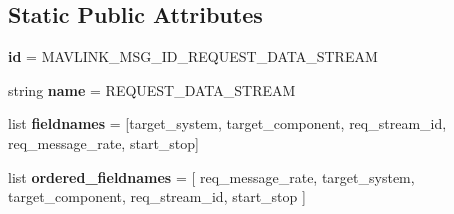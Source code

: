 \subsection*{Static Public Attributes}
\begin{DoxyCompactItemize}
\item 
\mbox{\label{classpymavlink_1_1dialects_1_1v10_1_1MAVLink__request__data__stream__message_a0b11fe3c57462e49916728544f1b598b}} 
{\bfseries id} = M\+A\+V\+L\+I\+N\+K\+\_\+\+M\+S\+G\+\_\+\+I\+D\+\_\+\+R\+E\+Q\+U\+E\+S\+T\+\_\+\+D\+A\+T\+A\+\_\+\+S\+T\+R\+E\+AM
\item 
\mbox{\label{classpymavlink_1_1dialects_1_1v10_1_1MAVLink__request__data__stream__message_a8f452ff560ec4194873dcadbca495078}} 
string {\bfseries name} = \textquotesingle{}R\+E\+Q\+U\+E\+S\+T\+\_\+\+D\+A\+T\+A\+\_\+\+S\+T\+R\+E\+AM\textquotesingle{}
\item 
\mbox{\label{classpymavlink_1_1dialects_1_1v10_1_1MAVLink__request__data__stream__message_aa290acdecdfed6cf1a29b62959cc61c6}} 
list {\bfseries fieldnames} = \mbox{[}\textquotesingle{}target\+\_\+system\textquotesingle{}, \textquotesingle{}target\+\_\+component\textquotesingle{}, \textquotesingle{}req\+\_\+stream\+\_\+id\textquotesingle{}, \textquotesingle{}req\+\_\+message\+\_\+rate\textquotesingle{}, \textquotesingle{}start\+\_\+stop\textquotesingle{}\mbox{]}
\item 
\mbox{\label{classpymavlink_1_1dialects_1_1v10_1_1MAVLink__request__data__stream__message_abd54ea1473ba34bba228565b0155d278}} 
list {\bfseries ordered\+\_\+fieldnames} = \mbox{[} \textquotesingle{}req\+\_\+message\+\_\+rate\textquotesingle{}, \textquotesingle{}target\+\_\+system\textquotesingle{}, \textquotesingle{}target\+\_\+component\textquotesingle{}, \textquotesingle{}req\+\_\+stream\+\_\+id\textquotesingle{}, \textquotesingle{}start\+\_\+stop\textquotesingle{} \mbox{]}
\item 
\mbox{\label{classpymavlink_1_1dialects_1_1v10_1_1MAVLink__request__data__stream__message_ae876538794b98ac412152660904a7d96}} 

\end{DoxyCompactItemize}
